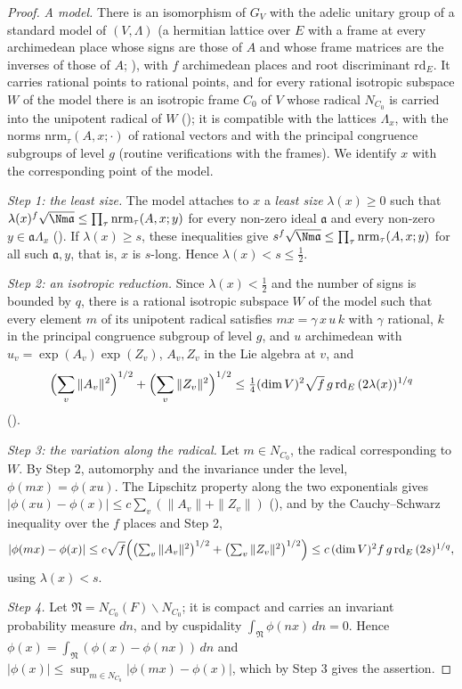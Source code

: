\begin{proof}
\emph{A model.} There is an isomorphism of $G_V$ with the adelic unitary group of a standard model of $(V,\Lambda)$ (a hermitian lattice over
$E$ with a frame at every archimedean place whose signs are those of $A$ and whose frame matrices are the inverses of those of $A$;
), with $f$ archimedean places and root discriminant $\mathrm{rd}_E$.
It carries rational points to rational points, and for every rational isotropic subspace $W$ of the model there is an isotropic frame
$C_0$ of $V$ whose radical $N_{C_0}$ is carried into the unipotent radical of $W$ (); it is
compatible with the lattices $\Lambda_x$, with the norms $\mathrm{nrm}_\tau(A,x;\cdot)$ of rational vectors and with the principal congruence
subgroups of level $g$ (routine verifications with the frames).
We identify $x$ with the corresponding point of the model.

\emph{Step 1: the least size.} The model attaches to $x$ a \emph{least size} $\lambda(x)\ge0$ such that
$\lambda(x)^f\sqrt{\Nm\mathfrak a}\le\prod_\tau\mathrm{nrm}_\tau(A,x;y)$ for every non-zero ideal $\mathfrak a$ and every non-zero $y\in\mathfrak a\Lambda_x$
(). If $\lambda(x)\ge s$, these inequalities give
$s^f\sqrt{\Nm\mathfrak a}\le\prod_\tau\mathrm{nrm}_\tau(A,x;y)$ for all such $\mathfrak a,y$, that is, $x$ is $s$-long. Hence $\lambda(x)<s\le\frac12$.

\emph{Step 2: an isotropic reduction.} Since $\lambda(x)<\frac12$ and the number of signs is bounded by $q$, there is a rational isotropic
subspace $W$ of the model such that every element $m$ of its unipotent radical satisfies $mx=\gamma\,x\,u\,k$ with $\gamma$ rational, $k$ in the
principal congruence subgroup of level $g$, and $u$ archimedean with $u_v=\exp(A_v)\exp(Z_v)$, $A_v,Z_v$ in the Lie algebra at $v$, and
\[
\Bigl(\sum_v\|A_v\|^2\Bigr)^{1/2}+\Bigl(\sum_v\|Z_v\|^2\Bigr)^{1/2}\le\tfrac14(\dim V)^2\sqrt f\,g\,\mathrm{rd}_E\,(2\lambda(x))^{1/q}
\]
().

\emph{Step 3: the variation along the radical.} Let $m\in N_{C_0}$, the radical corresponding to $W$. By Step 2, automorphy and the
invariance under the level, $\phi(mx)=\phi(xu)$. The Lipschitz property along the two exponentials gives
$|\phi(xu)-\phi(x)|\le c\sum_v(\|A_v\|+\|Z_v\|)$ (), and by the
Cauchy--Schwarz inequality over the $f$ places and Step 2,
\[
|\phi(mx)-\phi(x)|\le c\sqrt f\Bigl(\bigl(\textstyle\sum_v\|A_v\|^2\bigr)^{1/2}+\bigl(\sum_v\|Z_v\|^2\bigr)^{1/2}\Bigr)\le
c\,(\dim V)^2f\,g\,\mathrm{rd}_E\,(2s)^{1/q},
\]
using $\lambda(x)<s$.

\emph{Step 4.} Let $\mathfrak N=N_{C_0}(F)\backslash N_{C_0}$; it is compact and carries an invariant probability measure $dn$, and by cuspidality
$\int_{\mathfrak N}\phi(nx)\,dn=0$. Hence $\phi(x)=\int_{\mathfrak N}(\phi(x)-\phi(nx))\,dn$ and $|\phi(x)|\le\sup_{m\in N_{C_0}}|\phi(mx)-\phi(x)|$, which by
Step 3 gives the assertion.
\end{proof}

